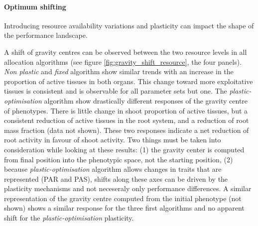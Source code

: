 
\paragraph{Optimum shifting}

Introducing resource availability variations and plasticity can impact the shape of the performance landscape.

A shift of gravity centres can be observed between the two resource levels in all allocation algorithms (see figure \ref{fig:gravity_shift_resource}, the four panels). \textit{Non plastic} and \textit{fixed} algorithm show similar trends with an increase in the proportion of active tissues in both organs. This change toward more exploitative tissues is consistent and is observable for all parameter sets but one. The \textit{plastic-optimisation} algorithm show drastically different responses of the gravity centre of phenotypes. There is little change in shoot proportion of active tissues, but a consistent reduction of active tissues in the root system, and a reduction of root mass fraction (data not shown). These two responses indicate a net reduction of root activity in favour of shoot activity. Two things must be taken into consideration while looking at these results: (1) the gravity center is computed from final position into the phenotypic space, not the starting position, (2) because \textit{plastic-optimisation} algorithm allows changes in traits that are represented (PAR and PAS), shifts along these axes can be driven by the plasticity mechanisms and not neceseraly only performance differences. A similar representation of the gravity centre computed from the initial phenotype (not shown) shows a similar response for the three first algorithms and no apparent shift for the \textit{plastic-optimisation} plasticity.


